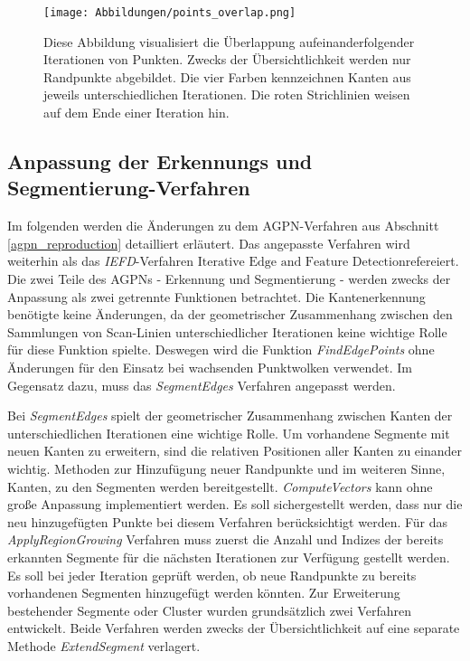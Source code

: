 \begin{figure}[t]
	\texttt{[image: Abbildungen/points\_overlap.png]}
	\centering
	\caption{Diese Abbildung visualisiert die Überlappung aufeinanderfolgender Iterationen von Punkten. Zwecks der Übersichtlichkeit werden nur Randpunkte abgebildet. Die vier Farben kennzeichnen Kanten aus jeweils unterschiedlichen Iterationen. Die roten Strichlinien weisen auf dem Ende einer Iteration hin.}
	\label{fig: point_overlap}
\end{figure}

\subsection{Anpassung der Erkennungs und Segmentierung-Verfahren}
Im folgenden werden die Änderungen zu dem AGPN-Verfahren aus Abschnitt \ref{agpn_reproduction} detailliert erläutert. Das angepasste Verfahren wird weiterhin als das \textit{IEFD}-Verfahren \textit{\(\text{Iterative Edge and Feature Detection}\)}refereiert. Die zwei Teile des AGPNs - Erkennung und Segmentierung - werden zwecks der Anpassung als zwei getrennte Funktionen betrachtet. Die Kantenerkennung benötigte keine Änderungen, da der geometrischer Zusammenhang zwischen den Sammlungen von Scan-Linien unterschiedlicher Iterationen keine wichtige Rolle für diese Funktion spielte. Deswegen wird die Funktion \textit{FindEdgePoints} ohne Änderungen für den Einsatz bei wachsenden Punktwolken verwendet. Im Gegensatz dazu, muss das \textit{SegmentEdges} Verfahren angepasst werden.

Bei \textit{SegmentEdges} spielt der geometrischer Zusammenhang zwischen Kanten der unterschiedlichen Iterationen eine wichtige Rolle. Um vorhandene Segmente mit neuen Kanten zu erweitern, sind die relativen Positionen aller Kanten zu einander wichtig. Methoden zur Hinzufügung neuer Randpunkte und im weiteren Sinne, Kanten, zu den Segmenten werden bereitgestellt. \textit{ComputeVectors} kann ohne große Anpassung implementiert werden. Es soll sichergestellt werden, dass nur die neu hinzugefügten Punkte bei diesem Verfahren berücksichtigt werden. Für das \textit{ApplyRegionGrowing} Verfahren muss zuerst die Anzahl und Indizes der bereits erkannten Segmente für die nächsten Iterationen zur Verfügung gestellt werden. Es soll bei jeder Iteration geprüft werden, ob neue Randpunkte zu bereits vorhandenen Segmenten hinzugefügt werden könnten. Zur Erweiterung bestehender Segmente oder Cluster wurden grundsätzlich zwei Verfahren entwickelt. Beide Verfahren werden zwecks der Übersichtlichkeit auf eine separate Methode \textit{ExtendSegment} verlagert.

